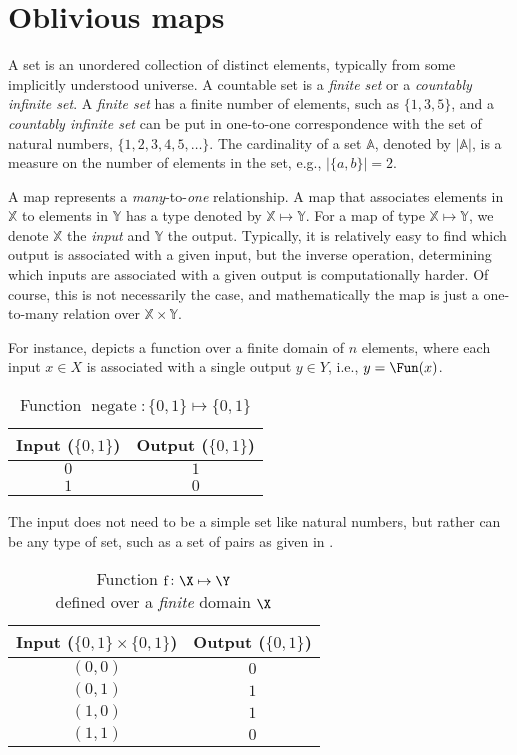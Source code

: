 \documentclass[ ../main.tex]{subfiles}
\begin{document}
\section{Oblivious maps}
\label{sec:map}
A set is an unordered collection of distinct elements, typically from some implicitly understood universe.
A countable set is a \emph{finite set} or a \emph{countably infinite set}. A \emph{finite set} has a finite number of elements, such as $\{ 1, 3, 5 \}$, and 
a \emph{countably infinite set} can be put in one-to-one correspondence with the set of natural numbers, $\{1,2,3,4,5,\ldots\}$.
The cardinality of a set $\mathbb{A}$, denoted by $|\mathbb{A}|$, is a measure on the number of elements in the set, e.g., $|\{a,b\}|=2$.

A map represents a \emph{many}-to-\emph{one} relationship. A map that associates elements in $\mathbb{X}$ to elements in $\mathbb{Y}$ has a type denoted by $\mathbb{X}\mapsto\mathbb{Y}$.
For a map of type $\mathbb{X} \mapsto \mathbb{Y}$, we denote $\mathbb{X}$ the \emph{input} and $\mathbb{Y}$ the output.
Typically, it is relatively easy to find which output is associated with a given input, but the inverse operation, determining which inputs are associated with a given output is computationally harder.
Of course, this is not necessarily the case, and mathematically the map is just a one-to-many relation over $\mathbb{X} \times \mathbb{Y}$.

For instance,  depicts a function over a finite domain of $n$ elements, where each input $x \in X$ is associated with a single output $y \in Y$, i.e., $y = \Fun(x)$.

\begin{table}
    \centering
    \caption{Function $\operatorname{negate} \colon \{0,1\} \mapsto \{0,1\}$}
    \label{tbl:tabfunc}
    \begin{tabular}{|c c|} 
        \hline
        Input ($\{0,1\}$) & Output ($\{0,1\}$)\\
        \hline
        $0$ & $1$\\
        $1$ & $0$\\    
        \hline
    \end{tabular}
\end{table}

The input does not need to be a simple set like natural numbers, but rather can be any type of set, such as a set of pairs as given in .

\begin{table}
\centering
\caption{Function $\operatorname{f} \colon \X \mapsto \Y$\\defined over a \emph{finite} domain $\X$}
\label{tbl:tabfunc2}
\begin{tabular}{|c c|} 
\hline
Input ($\{0,1\} \times \{0,1\}$) & Output ($\{0,1\}$)\\
\hline
    $(0,0)$ & $0$\\
    $(0,1)$ & $1$\\
    $(1,0)$ & $1$\\
    $(1,1)$ & $0$\\    
\hline
\end{tabular}
\end{table}
\end{document}
